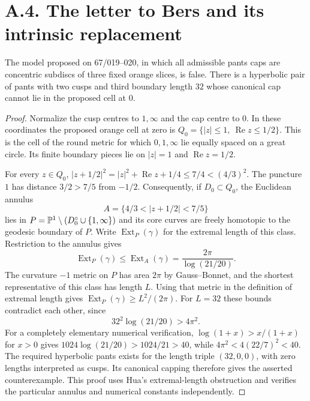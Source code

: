 \section{A.4. The letter to Bers and its intrinsic replacement}

\begin{theorem}\label{A:orange}
The model proposed on 67/019--020, in which all admissible pants caps
are concentric subdiscs of three fixed orange slices, is false.
There is a hyperbolic pair of pants with two cusps and third
boundary length $32$ whose canonical cap cannot lie in the
proposed cell at $0$.
\end{theorem}
\begin{proof}
Normalize the cusp centres to $1,\infty$ and the cap centre to $0$.
In these coordinates the proposed orange cell at zero is
$Q_0=\{|z|\leq1,\ \operatorname{Re}z\leq1/2\}$. This is the cell
of the round metric for which $0,1,\infty$ lie equally spaced on a
great circle. Its finite boundary pieces lie on $|z|=1$ and
$\operatorname{Re}z=1/2$.

For every $z\in Q_0$,
$|z+1/2|^2=|z|^2+\operatorname{Re}z+1/4\leq7/4<(4/3)^2$.
The puncture $1$ has distance $3/2>7/5$ from $-1/2$.
Consequently, if $D_0\subset Q_0$, the Euclidean annulus
\[
 A=\{4/3<|z+1/2|<7/5\}
\]
lies in $P={\mathbb{P}}^1\setminus(D_0^\circ\cup\{1,\infty\})$
and its core curves are freely homotopic to the geodesic boundary
of $P$. Write $\operatorname{Ext}_P(\gamma)$ for the extremal
length of this class. Restriction to the annulus gives
\[
 \operatorname{Ext}_P(\gamma)\leq
 \operatorname{Ext}_A(\gamma)
 =\frac{2\pi}{\log(21/20)}.
\]
The curvature $-1$ metric on $P$ has area $2\pi$ by Gauss--Bonnet,
and the shortest representative of this class has length $L$.
Using that metric in the definition of extremal length gives
$\operatorname{Ext}_P(\gamma)\geq L^2/(2\pi)$.
For $L=32$ these bounds contradict each other, since
\[
 32^2\log(21/20)>4\pi^2.
\]
For a completely elementary numerical verification,
$\log(1+x)>x/(1+x)$ for $x>0$ gives
$1024\log(21/20)>1024/21>40$, while
$4\pi^2<4(22/7)^2<40$.
The required hyperbolic pants exists for the length triple
$(32,0,0)$, with zero lengths interpreted as cusps. Its canonical
capping therefore gives the asserted counterexample. This proof
uses Hua's extremal-length obstruction and verifies the particular
annulus and numerical constants independently.
\end{proof}

